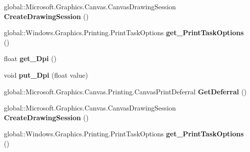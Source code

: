 \begin{DoxyCompactItemize}
global\+::\+Microsoft.\+Graphics.\+Canvas.\+Canvas\+Drawing\+Session {\bfseries Create\+Drawing\+Session} ()
\item 
\mbox{\label{interface_microsoft_1_1_graphics_1_1_canvas_1_1_printing_1_1_i_canvas_print_event_args_a71ce18a370233ad4a96b04294e81d699}} 
global\+::\+Windows.\+Graphics.\+Printing.\+Print\+Task\+Options {\bfseries get\+\_\+\+Print\+Task\+Options} ()
\item 
\mbox{\label{interface_microsoft_1_1_graphics_1_1_canvas_1_1_printing_1_1_i_canvas_print_event_args_a904d227a056eff386ed0a743b040faad}} 
float {\bfseries get\+\_\+\+Dpi} ()
\item 
\mbox{\label{interface_microsoft_1_1_graphics_1_1_canvas_1_1_printing_1_1_i_canvas_print_event_args_af46144e28207739e9392d369d6619b02}} 
void {\bfseries put\+\_\+\+Dpi} (float value)
\item 
\mbox{\label{interface_microsoft_1_1_graphics_1_1_canvas_1_1_printing_1_1_i_canvas_print_event_args_ab56989a826e9dc05d710c2959e2bb1a6}} 
global\+::\+Microsoft.\+Graphics.\+Canvas.\+Printing.\+Canvas\+Print\+Deferral {\bfseries Get\+Deferral} ()
\item 
\mbox{\label{interface_microsoft_1_1_graphics_1_1_canvas_1_1_printing_1_1_i_canvas_print_event_args_a638c3a913bba3112ce24903cdff62df6}} 
global\+::\+Microsoft.\+Graphics.\+Canvas.\+Canvas\+Drawing\+Session {\bfseries Create\+Drawing\+Session} ()
\item 
\mbox{\label{interface_microsoft_1_1_graphics_1_1_canvas_1_1_printing_1_1_i_canvas_print_event_args_a71ce18a370233ad4a96b04294e81d699}} 
global\+::\+Windows.\+Graphics.\+Printing.\+Print\+Task\+Options {\bfseries get\+\_\+\+Print\+Task\+Options} ()
\item 
\mbox{\label{interface_microsoft_1_1_graphics_1_1_canvas_1_1_printing_1_1_i_canvas_print_event_args_a904d227a056eff386ed0a743b040faad}} 

\end{DoxyCompactItemize}
